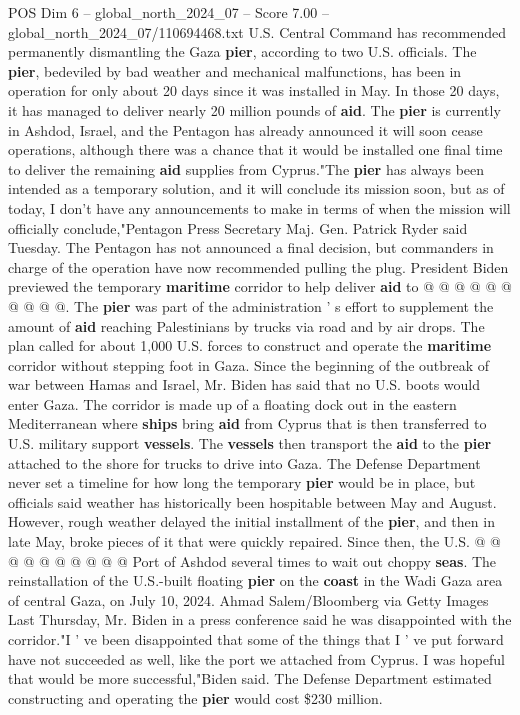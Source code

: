 \begin{textsample}{POS Dim 6 – global\_north\_2024\_07 – Score 7.00 – global\_north\_2024\_07/110694468.txt}  \label{ex:f6_pos_307}
U.S.
Central Command has recommended permanently dismantling the Gaza \textbf{pier}, according to two U.S. officials.
The \textbf{pier}, bedeviled by bad weather and mechanical malfunctions, has been in operation for only about 20 days since it was installed in May.
In those 20 days, it has managed to deliver nearly 20 million pounds of \textbf{aid}.
The \textbf{pier} is currently in Ashdod, Israel, and the Pentagon has already announced it will soon cease operations, although there was a chance that it would be installed one final time to deliver the remaining \textbf{aid} supplies from Cyprus."The \textbf{pier} has always been intended as a temporary solution, and it will conclude its mission soon, but as of today, I don't have any announcements to make in terms of when the mission will officially conclude,"Pentagon Press Secretary Maj.
Gen.
Patrick Ryder said Tuesday.
The Pentagon has not announced a final decision, but commanders in charge of the operation have now recommended pulling the plug.
President Biden previewed the temporary \textbf{maritime} corridor to help deliver \textbf{aid} to @ @ @ @ @ @ @ @ @ @.
The \textbf{pier} was part of the administration ' s effort to supplement the amount of \textbf{aid} reaching Palestinians by trucks via road and by air drops.
The plan called for about 1,000 U.S. forces to construct and operate the \textbf{maritime} corridor without stepping foot in Gaza.
Since the beginning of the outbreak of war between Hamas and Israel, Mr.
Biden has said that no U.S. boots would enter Gaza.
The corridor is made up of a floating dock out in the eastern Mediterranean where \textbf{ships} bring \textbf{aid} from Cyprus that is then transferred to U.S. military support \textbf{vessels}.
The \textbf{vessels} then transport the \textbf{aid} to the \textbf{pier} attached to the shore for trucks to drive into Gaza.
The Defense Department never set a timeline for how long the temporary \textbf{pier} would be in place, but officials said weather has historically been hospitable between May and August.
However, rough weather delayed the initial installment of the \textbf{pier}, and then in late May, broke pieces of it that were quickly repaired.
Since then, the U.S. @ @ @ @ @ @ @ @ @ @ Port of Ashdod several times to wait out choppy \textbf{seas}.
The reinstallation of the U.S.-built floating \textbf{pier} on the \textbf{coast} in the Wadi Gaza area of central Gaza, on July 10, 2024.
Ahmad Salem/Bloomberg via Getty Images Last Thursday, Mr.
Biden in a press conference said he was disappointed with the corridor."I ' ve been disappointed that some of the things that I ' ve put forward have not succeeded as well, like the port we attached from Cyprus.
I was hopeful that would be more successful,"Biden said.
The Defense Department estimated constructing and operating the \textbf{pier} would cost \$230 million.

\end{textsample}
